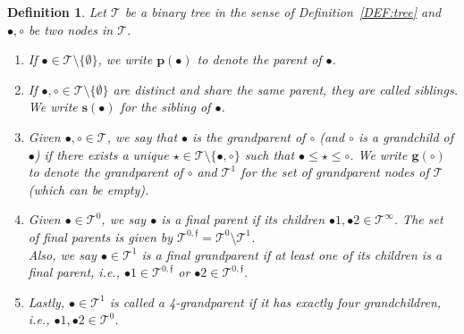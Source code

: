 \documentclass[%
11pt,  reqno]{amsart}
\newcommand{\5}{\textup{V}}
\newtheorem{definition}[theorem]{Definition}
\theoremstyle{remark}
\newcommand{\bul}{\bullet}
\newcommand{\TT}{\mathcal{T}}
\newcommand{\pb}{\mathbf{p}}
\newcommand{\gb}{\mathbf{g}}
\newcommand{\sbf}{\mathbf{s}}
\newcommand{\ff}{\mathfrak{f}}
\numberwithin{equation}{section}
\numberwithin{theorem}{section}
\begin{document}
\begin{definition}\rm
\label{DEF:tree2}
Let $\TT$ be a binary tree in the sense of Definition~\ref{DEF:tree} and 
$\bul, \circ$ be two nodes in $\TT$. 

\begin{enumerate}



\smallskip
\item[(i)]
If $\bul \in \TT\setminus \{ \emptyset\}$, we write $\pb(\bul)$ to denote the parent of $\bul$.

\smallskip
\item[(ii)] 
If $\bul, \circ\in \TT \setminus\{ \emptyset \}$ are distinct and share the same parent, they are called \textit{siblings}. We write $\sbf(\bul)$ for the sibling of $\bul$. 

\smallskip
\item[(iii)] 
Given $\bul, \circ\in \TT$, we say that $\bul$ is the \textit{grandparent} of $\circ$ (and $\circ$ is a \textit{grandchild} of $\bul$) if there exists a unique $\star\in \TT \setminus \{\bul, \circ\}$ such that $\bul \le \star\le \circ$. We write $ \gb(\circ) $ to denote the grandparent of $\circ$ and $\TT^1$ for the set of grandparent nodes of $\TT$ (which can be empty). 

\smallskip
\item[(iv)] 
Given $\bul\in \TT^0$, we say $\bul$ is a \textit{final parent} if its children $\bul1, \bul2 \in \TT^\infty$. The set of final parents is given by $\TT^{0,\ff} = \TT^0 \setminus \TT^1$.
\\
Also, we say $\bul\in \TT^1$ is a \textit{final grandparent} if at least one of its children is a final parent, i.e., $\bul1 \in \TT^{0,\ff}$ or $\bul2 \in \TT^{0,\ff}$.  

\smallskip
\item[(v)] 
Lastly, $\bul\in \TT^1$ is called a \textit{4-grandparent} if it has exactly four grandchildren, i.e., $\bul1, \bul2 \in \TT^0$. 

\end{enumerate}



\end{definition}
\end{document}
